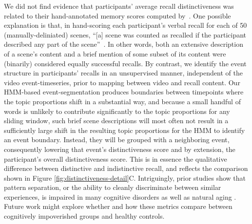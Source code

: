 \documentclass{article}
\begin{document}
We did not find evidence that participants' average recall distinctiveness was related to their hand-annotated memory scores computed by~\cite{ChenEtal17}.  One possible explanation is that, in hand-scoring each participant's verbal recall for each of 50 (manually-deliniated) scenes, ``[a] scene was counted as recalled if the participant described any part of the scene''~\citep{ChenEtal17}.  In other words, both an extensive description of a scene's content and a brief mention of some subset of its content were (binarily) considered equally successful recalls.  By contrast, we identify the event structure in participants' recalls in an unsupervised manner, independent of the video event-timeseries, prior to mapping between video and recall content.  Our HMM-based event-segmentation produces boundaries between timepoints where the topic proportions shift in a substantial way, and because a small handful of words is unlikely to contribute significantly to the topic proportions for any sliding window, such brief scene descriptions will most often not result in a sufficiently large shift in the resulting topic proportions for the HMM to identify an event boundary.  Instead, they will be grouped with a neighboring event, consequently lowering that event's distinctiveness score and by extension, the participant's overall distinctiveness score.  This is in essence the qualitative difference between distinctive and indistinctive recall, and reflects the comparison shown in Figure \ref{fig:distinctiveness-detail}C.  Intriguingly, prior studies show that pattern separation, or the ability to cleanly discriminate between similar experiences, is impaired in many cognitive disorders as well as natural aging \citep{StarEtal10, YassEtal11c, YassStar11b}.  Future work might explore whether and how these metrics compare between cognitively impoverished groups and healthy controls.
\end{document}
